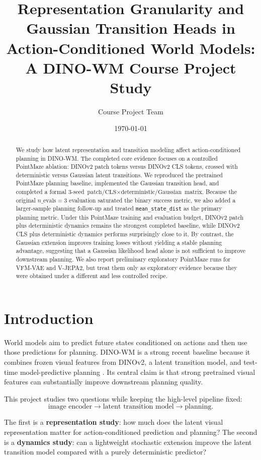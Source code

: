 \documentclass[11pt]{article}
\title{Representation Granularity and Gaussian Transition Heads in Action-Conditioned World Models:\\
A DINO-WM Course Project Study}
\author{Course Project Team}
\date{\today}
\begin{document}
\maketitle

\begin{abstract}
We study how latent representation and transition modeling affect action-conditioned planning in DINO-WM. The completed core evidence focuses on a controlled PointMaze ablation: DINOv2 patch tokens versus DINOv2 CLS tokens, crossed with deterministic versus Gaussian latent transitions. We reproduced the pretrained PointMaze planning baseline, implemented the Gaussian transition head, and completed a formal \(3\)-seed \( \text{patch/CLS} \times \text{deterministic/Gaussian} \) matrix. Because the original \(n\_\text{evals}=3\) evaluation saturated the binary success metric, we also added a larger-sample planning follow-up and treated \texttt{mean\_state\_dist} as the primary planning metric. Under this PointMaze training and evaluation budget, DINOv2 patch plus deterministic dynamics remains the strongest completed baseline, while DINOv2 CLS plus deterministic dynamics performs surprisingly close to it. By contrast, the Gaussian extension improves training losses without yielding a stable planning advantage, suggesting that a Gaussian likelihood head alone is not sufficient to improve downstream planning. We also report preliminary exploratory PointMaze runs for VFM-VAE and V-JEPA2, but treat them only as exploratory evidence because they were obtained under a different and less controlled recipe.
\end{abstract}

\section{Introduction}
World models aim to predict future states conditioned on actions and then use those predictions for planning. DINO-WM is a strong recent baseline because it combines frozen visual features from DINOv2, a latent transition model, and test-time model-predictive planning \citep{zhou2024dinowm}. Its central claim is that strong pretrained visual features can substantially improve downstream planning quality.

This project studies two questions while keeping the high-level pipeline fixed:
\[
\text{image encoder} \rightarrow \text{latent transition model} \rightarrow \text{planning}.
\]

The first is a \textbf{representation study}: how much does the latent visual representation matter for action-conditioned prediction and planning? The second is a \textbf{dynamics study}: can a lightweight stochastic extension improve the latent transition model compared with a purely deterministic predictor?
\end{document}
